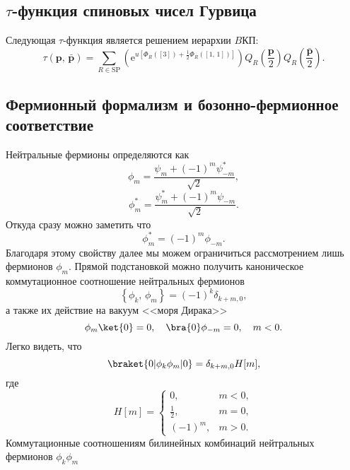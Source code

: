 \documentclass[a5paper,twoside]{extarticle}
\begin{document}
\subsection{$\tau$-функция спиновых чисел Гурвица}
Следующая $\tau$-функция является решением иерархии $B$КП:
\begin{equation}
	\tau \left( \mathbf{p},\,\bar{\mathbf{p}} \right) =
	\sum_{R \in \mathrm{SP}}^{} \left( \mathrm{e} ^{u \left[ 
	\Phi_R\left( \left[ 3 \right]  \right) +\frac{1}{2}\Phi_R \left( \left[ 1,\,1 \right]  \right) \right] } \right) Q_R\left(\frac{\mathbf{p}}{2}\right)Q_R \left(\frac{\bar{\mathbf{p}}}{2}\right)
	\label{}
.\end{equation}
\subsection{Фермионный формализм и бозонно-фермионное соответствие}
Нейтральные фермионы определяются как
\[
	\phi_m= \frac{\psi_m +\left( -1 \right) ^m \psi^*_{-m}}{\sqrt{2} }
,\] 
\[
	\phi_m^*= \frac{\psi_m^* +\left( -1 \right) ^m \psi_{-m}}{\sqrt{2} }
.\]
Откуда сразу можно заметить что 
\[
	\phi_m^*= (-1)^m \phi_{-m}
.\] 
Благодаря этому свойству далее мы можем ограничиться
рассмотрением лишь фермионов $ \phi_m  $.
Прямой подстановкой можно получить каноническое коммутационное соотношение нейтральных
фермионов
\begin{equation}
	\left\{ \phi_k,\,\phi_m \right\} =\left( -1 \right) ^k
	\delta_{k+m,0}
,\end{equation} 
а также их действие на вакуум <<моря Дирака>>
\[
\phi_m \ket{0}=0,\quad
\bra{0}\phi_{-m} =0,\quad m<0.\] 
Легко видеть, что 
\[
	\braket{0 | \phi_k \phi_m | 0}=\delta_{k+m,0} H[m]
,\]
где
\[
	H[m]= \begin{cases}
		0,& m<0,\\
		\frac{1}{2},& m=0,\\
		(-1)^m,& m>0.
	\end{cases}
\] 
Коммутационные соотношениям
билинейных комбинаций нейтральных фермионов $\phi_k \phi_m$
\end{document}
